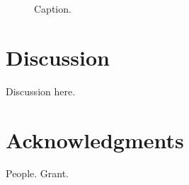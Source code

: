 \documentclass[12pt]{article}
\begin{document}
\begin{figure}[H]
	\centering
	\caption{Caption.}
	\label{fig:di-time}
\end{figure}


\section{Discussion}
\label{sec:disc}
Discussion here.



\section*{Acknowledgments}
\label{sec:ack}
People. Grant.



\pagebreak
\printbibliography
\pagebreak
\end{document}
